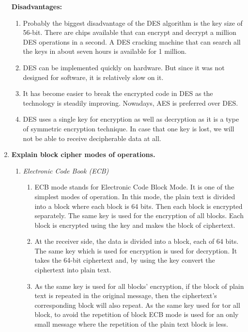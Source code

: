 \documentclass[11pt]{article}
\begin{document}
\begin{enumerate}
	      \textbf{Disadvantages:}
	      \begin{enumerate}
		      \item Probably the biggest disadvantage of the DES algorithm is the key size of 56-bit. There are chips available that can encrypt and decrypt a million DES operations in a second. A DES cracking machine that can search all the keys in about seven hours is available for 1 million.
		      \item DES can be implemented quickly on hardware. But since it was not designed for software, it is relatively slow on it.
		      \item It has become easier to break the encrypted code in DES as the technology is steadily improving. Nowadays, AES is preferred over DES.
		      \item DES uses a single key for encryption as well as decryption as it is a type of symmetric encryption technique. In case that one key is lost, we will not be able to receive decipherable data at all.
	      \end{enumerate}

	\item \textbf{Explain block cipher modes of operations.}\\
	      \begin{enumerate}
		      \item \textit{Electronic Code Book (ECB)}
		            \begin{enumerate}
			            \item ECB mode stands for Electronic Code Block Mode. It is one of the simplest modes of operation. In this mode, the plain text is divided into a block where each block is 64 bits. Then each block is encrypted separately. The same key is used for the encryption of all blocks. Each block is encrypted using the key and makes the block of ciphertext.
			            \item At the receiver side, the data is divided into a block, each of 64 bits. The same key which is used for encryption is used for decryption. It takes the 64-bit ciphertext and, by using the key convert the ciphertext into plain text.
			            \item As the same key is used for all blocks’ encryption, if the block of plain text is repeated in the original message, then the ciphertext’s corresponding block will also repeat. As the same key used for tor all block, to avoid the repetition of block ECB mode is used for an only small message where the repetition of the plain text block is less.
		            \end{enumerate}


\end{enumerate}
\end{enumerate}
\end{document}
